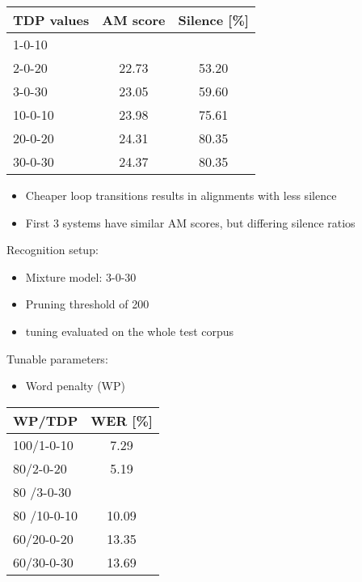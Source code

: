 \documentclass[11pt, a4paper, landscape]{article}
\begin{document}
\begin{center}
\begin{tabular}{| l |  c | c |} \toprule
  TDP values & AM score           & Silence [\%]      \\ \midrule
  1-0-10     & \color{red}{22.68} & \color{red}{43.48}\\
  2-0-20     & 22.73              & 53.20             \\
  3-0-30     & 23.05              & 59.60             \\ \midrule
  10-0-10    & 23.98              & 75.61             \\
  20-0-20    & 24.31              & 80.35             \\
  30-0-30    & 24.37              & 80.35             \\ \bottomrule
\end{tabular}
\end{center}
\begin{itemize}
	\item Cheaper loop transitions results in alignments with less silence
	\item First 3 systems have similar AM scores, but differing silence ratios
\end{itemize}
\vfill


\NewPage{}
\vfill
Recognition setup:
\begin{itemize}
	\item Mixture model: 3-0-30 
	\item Pruning threshold of 200
	\item tuning evaluated on the whole test corpus
\end{itemize}
Tunable parameters:
\begin{itemize}	
	\item Word penalty (WP)
\end{itemize}

\begin{center}
	\begin{tabular}{| l | c |} \toprule
		WP/TDP      &    WER [\%]    \\ \midrule
		100/1-0-10  &    7.29        \\
		80/2-0-20   &    5.19        \\
		80 /3-0-30  &\color{red}{4.7}\\ \midrule
		80 /10-0-10 &    10.09       \\
		60/20-0-20  &    13.35       \\
		60/30-0-30  &    13.69       \\ \bottomrule
		
	\end{tabular}
\end{center}
\vfill
\end{document}
